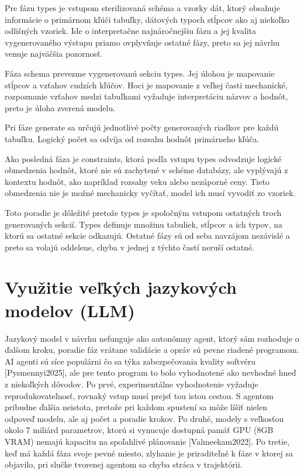 Pre fázu types je vstupom sterilizovaná schéma a vzorky dát, ktorý obsahuje informácie o primárnom kľúči tabuľky, dátových typoch stĺpcov ako aj niekoľko odlišných vzoriek. Ide o interpretačne najnáročnejšiu fázu a jej kvalita vygenerovaného výstupu priamo ovplyvňuje ostatné fázy, preto sa jej návrhu venuje najväčšia pozornosť. 

Fáza schema prevezme vygenerovanú sekciu types. Jej úlohou je mapovanie stĺpcov a vzťahov cudzích kľúčov. Hoci je mapovanie z veľkej časti mechanické, rozpoznanie vzťahov medzi tabuľkami vyžaduje interpretáciu názvov a hodnôt, preto je úloha zverená modelu.

Pri fáze generate sa určujú jednotlivé počty generovaných riadkov pre každú tabuľku. Logický počet sa odvíja od rozsahu hodnôt primárneho kľúča.

Ako posledná fáza je constraints, ktorá podľa vstupu types odvodzuje logické obmedzenia hodnôt, ktoré nie sú zachytené v schéme databázy, ale vyplývajú z kontextu hodnôt, ako napríklad rozsahy veku alebo nezáporné ceny. Tieto obmedzenia nie je možné mechanicky vyčítať, model ich musí vyvodiť zo vzoriek.

Toto poradie je dôležité pretože types je spoločným vstupom ostatných troch generovaných sekcií. Types definuje množinu tabuliek, stĺpcov a ich typov, na ktorú sa ostatné sekcie odkazujú. Ostatné fázy sú od seba  navzájom nezávislé a preto sa volajú oddelene, chyba v jednej z týchto častí neruší ostatné. 

\section{Využitie veľkých jazykových modelov (LLM)}
Jazykový model v návrhu nefunguje ako autonómny agent, ktorý sám rozhoduje o ďalšom kroku, poradie fáz vrátane validácie a opráv sú pevne riadené programom. AI agenti sú síce populárni čo sa týka zabezpečovania kvality softvéru [Pysmennyi2025], ale pre tento program to bolo vyhodnotené ako nevhodné hneď z niekoľkých dôvodov. Po prvé, experimentálne vyhodnotenie vyžaduje reprodukovateľnosť, rovnaký vstup musí prejsť tou istou cestou. S agentom pribudne ďalšia neistota, pretože pri každom spustení sa môže líšiť nielen odpoveď modelu, ale aj počet a poradie krokov. Po druhé, modely s veľkosťou okolo 7 miliárd parametrov, ktorú si vynucuje dostupná pamäť GPU (8GB VRAM) nemajú kapacitu na spoľahlivé plánovanie [Valmeekam2022]. Po tretie, keď má každá fáza svoje pevné miesto, zlyhanie je priraditeľné k fáze v ktorej sa objavilo, pri slučke tvorenej agentom sa chyba stráca v trajektórii.

